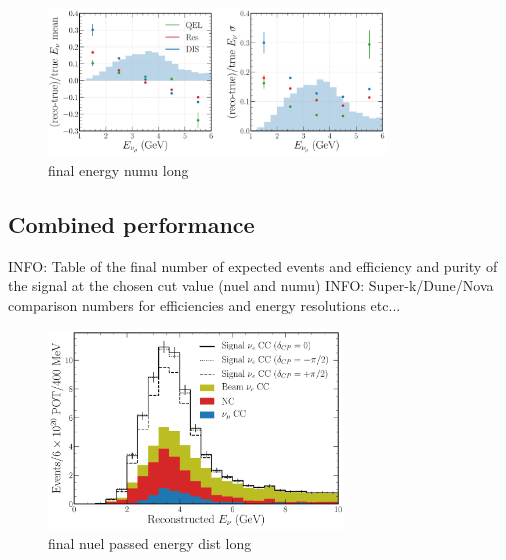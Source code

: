 \begin{figure} %
    \includegraphics[width=0.8\textwidth]{diagrams/6-cvn/chipsnet/final_energy_numu.pdf}
    \caption[final energy numu short]
    {final energy numu long}
    \label{fig:final_energy_numu}
\end{figure}

\subsection{Combined performance} %
\label{sec:cvn_results_combined} %

INFO: Table of the final number of expected events and efficiency and purity of the signal at the
chosen cut value (nuel and numu)
INFO: Super-k/Dune/Nova comparison numbers for efficiencies and energy resolutions etc...

\begin{figure} %
    \includegraphics[width=0.7\textwidth]{diagrams/6-cvn/chipsnet/final_nuel_passed_energy_dist.pdf}
    \caption[final nuel passed energy dist short]
    {final nuel passed energy dist long}
    \label{fig:final_nuel_passed_energy_dist}
\end{figure}

